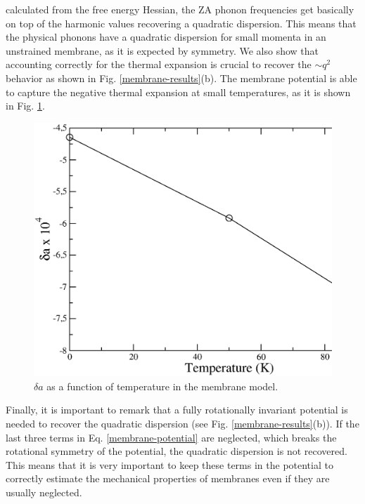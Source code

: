calculated from the free energy Hessian, the ZA phonon frequencies get basically on top of the harmonic values 
recovering a quadratic dispersion. This means that the physical phonons have a quadratic dispersion for small momenta 
in an unstrained membrane, as it is expected by symmetry. We also show that accounting correctly for the thermal 
expansion is crucial to recover the $\sim q^2$ behavior as shown in Fig. \ref{membrane-results}(b). The membrane 
potential is able to capture the negative thermal expansion at small temperatures, as it is shown in 
Fig. \ref{cte-membrane}. 
\begin{figure}[ht]
\includegraphics[width=0.8\linewidth]{Figures/cte-membrane.eps}
\caption{$\delta a$ as a function of temperature in the membrane model.}
\label{cte-membrane}
\end{figure}
Finally, it is important to remark that a fully rotationally invariant potential is needed to recover the quadratic 
dispersion (see Fig. \ref{membrane-results}(b)). If the last three terms in Eq. \ref{membrane-potential} are 
neglected, which breaks the rotational symmetry of the potential, the quadratic dispersion is not recovered. This 
means that it is very important to keep these terms in the potential to correctly estimate the mechanical properties 
of membranes even if they are usually neglected\cite{mariani2008flexural,amorim2014thermodynamics,de2012bending}. \\

